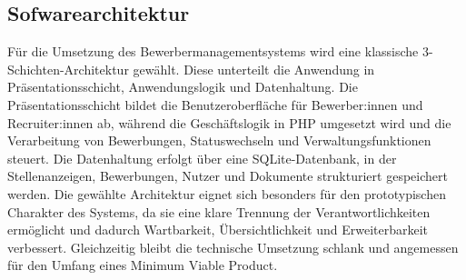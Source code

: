 \subsection{Sofwarearchitektur}
Für die Umsetzung des Bewerbermanagementsystems wird eine klassische 3-Schichten-Architektur gewählt. 
Diese unterteilt die Anwendung in Präsentationsschicht, Anwendungslogik und Datenhaltung. 
Die Präsentationsschicht bildet die Benutzeroberfläche für Bewerber:innen und Recruiter:innen ab, während die Geschäftslogik in PHP umgesetzt wird und die Verarbeitung von Bewerbungen, Statuswechseln und Verwaltungsfunktionen steuert. 
Die Datenhaltung erfolgt über eine SQLite-Datenbank, in der Stellenanzeigen, Bewerbungen, Nutzer und Dokumente strukturiert gespeichert werden.
Die gewählte Architektur eignet sich besonders für den prototypischen Charakter des Systems, da sie eine klare Trennung der Verantwortlichkeiten ermöglicht und dadurch Wartbarkeit, Übersichtlichkeit und Erweiterbarkeit verbessert. Gleichzeitig bleibt die technische Umsetzung schlank und angemessen für den Umfang eines Minimum Viable Product.
